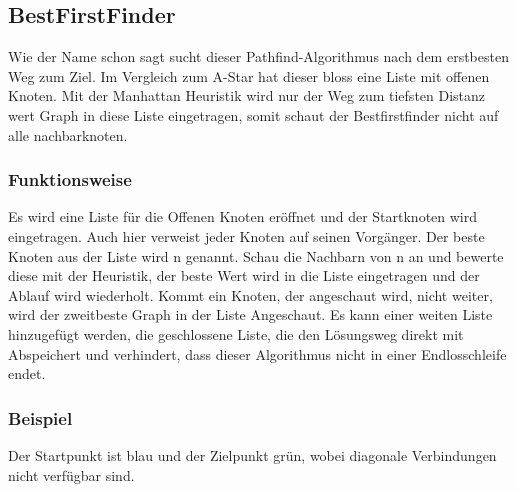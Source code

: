 \subsection{BestFirstFinder}

Wie der Name schon sagt sucht dieser Pathfind-Algorithmus nach dem
erstbesten Weg zum Ziel. Im Vergleich zum A-Star hat dieser bloss eine
Liste mit offenen Knoten. Mit der Manhattan Heuristik wird nur der Weg
zum tiefsten Distanz wert Graph in diese Liste eingetragen, somit schaut
der Bestfirstfinder nicht auf alle nachbarknoten.

\subsubsection{Funktionsweise}

Es wird eine Liste für die Offenen Knoten eröffnet und der Startknoten
wird eingetragen. Auch hier verweist jeder Knoten auf seinen Vorgänger.
Der beste Knoten aus der Liste wird n genannt. Schau die Nachbarn von n
an und bewerte diese mit der Heuristik, der beste Wert wird in die Liste
eingetragen und der Ablauf wird wiederholt. Kommt ein Knoten, der
angeschaut wird, nicht weiter, wird der zweitbeste Graph in der Liste
Angeschaut. Es kann einer weiten Liste hinzugefügt werden, die
geschlossene Liste, die den Lösungsweg direkt mit Abspeichert und
verhindert, dass dieser Algorithmus nicht in einer Endlosschleife endet.
\cite[Roblox Developer, 2018]{robdevbff}

\subsubsection{Beispiel}

Der Startpunkt ist blau und der Zielpunkt grün, wobei diagonale Verbindungen nicht verfügbar sind.

